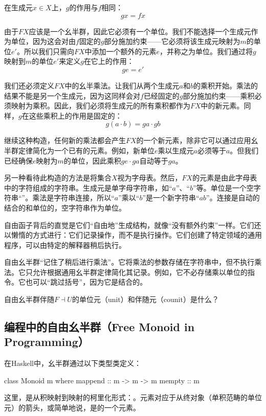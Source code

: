 \documentclass[DaoFP]{subfiles}
\begin{document}
    在生成元$x \in X$上，$g$的作用与$f$相同：
    \[ g x = f x \]

    由于$F X$应该是一个幺半群，因此它必须有一个单位。我们不能选择一个生成元作为单位，因为这会对由$f$固定的$g$部分施加约束——它必须将该生成元映射为$m$的单位$e'$。所以我们只需向$F X$中添加一个额外的元素$e$，并称之为单位。我们通过将$g$映射到$m$的单位$e'$来定义$g$在它上的作用：
    \[ g e = e' \]

    我们还必须定义$F X$中的幺半乘法。让我们从两个生成元$a$和$b$的乘积开始。乘法的结果不能是另一个生成元，因为这同样会对$f$已经固定的$g$部分施加约束——乘积必须映射为乘积。因此，我们必须将生成元的所有乘积都作为$F X$中的新元素。同样，$g$在这些乘积上的作用是固定的：
    \[ g (a \cdot b)  = g a \cdot g b\]

    继续这种构造，任何新的乘法都会产生$F X$的一个新元素，除非它可以通过应用幺半群定律简化为一个已有的元素。例如，新单位$e$乘以生成元$a$必须等于$a$。但我们已经确保$e$映射为$m$的单位，因此乘积$g e \cdot g a$自动等于$g a$。

    另一种看待此构造的方法是将集合$X$视为字母表。然后，$F X$的元素是由此字母表中的字符组成的字符串。生成元是单字母字符串，如“$a$”、“$b$”等。单位是一个空字符串“”。乘法是字符串连接，所以“$a$”乘以“$b$”是一个新字符串“$ab$”。连接是自动的结合的和单位的，空字符串作为单位。

    自由函子背后的直觉是它们“自由地”生成结构，就像“没有额外约束”一样。它们还以懒惰的方式进行：它们记录操作，而不是执行操作。它们创建了特定领域的通用程序，可以由特定的解释器稍后执行。

    自由幺半群“记住了稍后进行乘法”。它将乘法的参数存储在字符串中，但不执行乘法。它只允许根据通用幺半群定律简化其记录。例如，它不必存储乘以单位的指令。它也可以“跳过括号”，因为它是结合的。

    \begin{exercise}
        自由幺半群伴随$F \dashv U$的单位元（unit）和伴随元（counit）是什么？
    \end{exercise}

    \subsection{编程中的自由幺半群（Free Monoid in Programming）}

    在Haskell中，幺半群通过以下类型类定义：
    \begin{haskell}
        class Monoid m where
        mappend :: m -> m -> m
        mempty  :: m
    \end{haskell}
    这里，是从积映射到映射的柯里化形式：。元素对应于从终对象（单积范畴的单位元）的箭头，或简单地说，是的一个元素。
\end{document}
